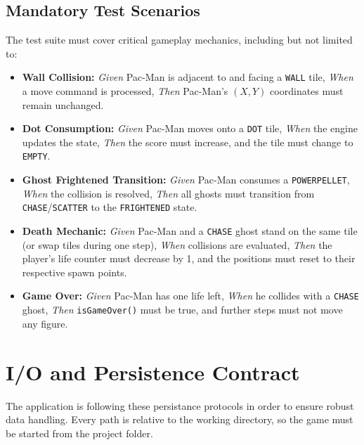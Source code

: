 \documentclass[11pt, a4paper]{article}
\begin{document}
\subsection*{Mandatory Test Scenarios}
The test suite must cover critical gameplay mechanics, including but not limited to:
\begin{itemize}
    \item \textbf{Wall Collision:} \textit{Given} Pac-Man is adjacent to and facing a \texttt{WALL} tile, \textit{When} a move command is processed, \textit{Then} Pac-Man's $(X, Y)$ coordinates must remain unchanged.
    \item \textbf{Dot Consumption:} \textit{Given} Pac-Man moves onto a \texttt{DOT} tile, \textit{When} the engine updates the state, \textit{Then} the score must increase, and the tile must change to \texttt{EMPTY}.
    \item \textbf{Ghost Frightened Transition:} \textit{Given} Pac-Man consumes a \texttt{POWERPELLET}, \textit{When} the collision is resolved, \textit{Then} all ghosts must transition from \texttt{CHASE}/\texttt{SCATTER} to the \texttt{FRIGHTENED} state.
    \item \textbf{Death Mechanic:} \textit{Given} Pac-Man and a \texttt{CHASE} ghost stand on the same tile (or swap tiles during one step), \textit{When} collisions are evaluated, \textit{Then} the player's life counter must decrease by 1, and the positions must reset to their respective spawn points.
    \item \textbf{Game Over:} \textit{Given} Pac-Man has one life left, \textit{When} he collides with a \texttt{CHASE} ghost, \textit{Then} \texttt{isGameOver()} must be true, and further steps must not move any figure.
\end{itemize}
\clearpage

\section{I/O and Persistence Contract}
\label{sec:io}
The application is following these persistance protocols in order to ensure robust data handling. Every path is relative to the working directory, so the game must be started from the project folder.
\end{document}
